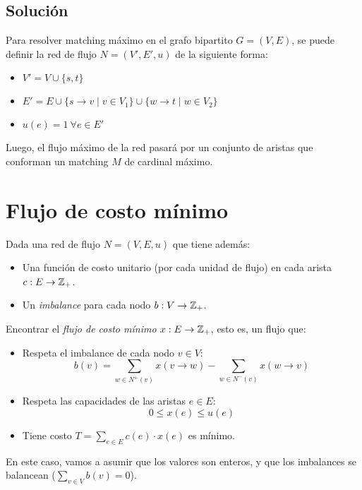 \subsection{Solución}

Para resolver matching máximo en el grafo bipartito $G = (V, E)$, se puede definir la red de flujo $N =(V', E', u)$ de la siguiente forma:
\begin{itemize}
    \item $V' = V \cup \{s, t\}$
    \item $E' = E \cup \{s \rightarrow v \mid v \in V_1\} \cup \{w \rightarrow t \mid w \in V_2\}$
    \item $u(e) = 1\ \forall e \in E'$
\end{itemize}

Luego, el flujo máximo de la red pasará por un conjunto de aristas que conforman un matching $M$ de cardinal máximo.


\section{Flujo de costo mínimo}

\begin{problema}
    Dada una red de flujo $N = (V, E, u)$ que tiene además:
    \begin{itemize}
        \item Una función de costo unitario (por cada unidad de flujo) en cada arista $c: E \rightarrow \mathbb{Z}_+$.
        \item Un \textit{imbalance} para cada nodo $b: V \rightarrow \mathbb{Z}_+$.
    \end{itemize}

    Encontrar el \textit{flujo de costo mínimo} $x: E \rightarrow \mathbb{Z}_+$, esto es, un flujo que:
    \begin{itemize}
        \item Respeta el imbalance de cada nodo $v \in V$:
              $$b(v) = \sum_{w \in N^+(v)} x(v \rightarrow w) - \sum_{w \in N^-(v)} x(w \rightarrow v)$$
        \item Respeta las capacidades de las aristas $e \in E$:
              $$0 \leq x(e) \leq u(e)$$
        \item Tiene costo $T = \sum_{e \in E} c(e) \cdot x(e)$ es mínimo.
    \end{itemize}
\end{problema}

En este caso, vamos a asumir que los valores son enteros, y que los imbalances se balancean ($\sum_{v \in V} b(v) = 0$).

